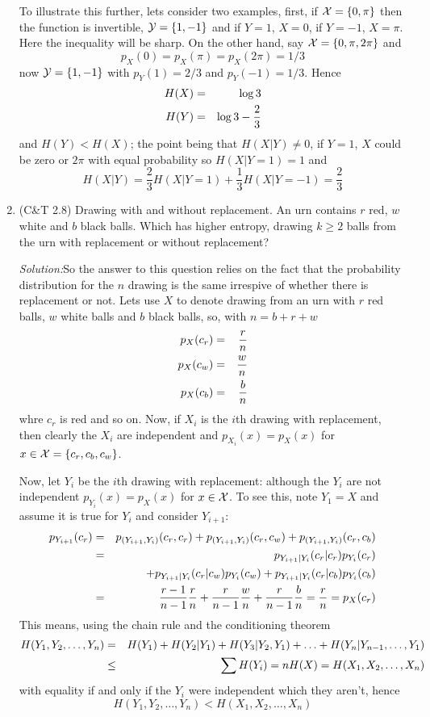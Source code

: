 \documentclass[12pt]{article}
\newcommand{\soln}{\noindent\textit{Solution:}}
\begin{document}
\begin{enumerate}
To illustrate this further, lets consider two examples, first, if
${\cal X}=\{0,\pi\}$ then the function is invertible, ${\cal
  Y}=\{1,-1\}$ and if $Y=1$, $X=0$, if $Y=-1$, $X=\pi$. Here the
inequality will be sharp. On the other hand, say ${\cal X}=\{0,\pi,2\pi\}$ and 
\begin{equation}
p_X(0)=p_X(\pi)=p_X(2\pi)=1/3
\end{equation}
now ${\cal Y}=\{1,-1\}$ with $p_Y(1)=2/3$ and $p_Y(-1)=1/3$. Hence 
\begin{eqnarray}
H(X)&=&\log{3}\cr
H(Y)&=&\log{3}-\frac{2}{3}
\end{eqnarray}
and $H(Y)<H(X)$; the point being that $H(X|Y)\not=0$, if $Y=1$, $X$ could be zero or $2\pi$ with equal probability so $H(X|Y=1)=1$ and
\begin{equation}
H(X|Y)=\frac{2}{3}H(X|Y=1)+\frac{1}{3}H(X|Y=-1)=\frac{2}{3}
\end{equation}


\item (C\&T 2.8) Drawing with and without replacement. An urn contains
$r$ red, $w$ white and $b$ black balls. Which has higher entropy,
drawing $k\ge 2$ balls from the urn with replacement or without
replacement?


\soln So the answer to this question relies on the fact that the
probability distribution for the $n$ drawing is the same irrespive of
whether there is replacement or not. Lets use $X$ to denote drawing from an urn with $r$ red balls, $w$ white balls and $b$ black balls, so, with $n=b+r+w$
\begin{eqnarray}
p_X(c_r)&=&\frac{r}{n}\cr
p_X(c_w)&=&\frac{w}{n}\cr
p_X(c_b)&=&\frac{b}{n}
\end{eqnarray}
whre $c_r$ is red and so on. Now, if $X_i$ is the $i$th drawing with replacement, then clearly the $X_i$ are independent and $p_{X_i}(x)=p_X(x)$ for $x\in{\cal X}=\{c_r,c_b,c_w\}$.

Now, let $Y_i$ be the $i$th drawing with replacement: although the
$Y_i$ are not independent $p_{Y_i}(x)=p_X(x)$ for $x\in{\cal X}$. To see this, note $Y_1=X$ and assume it is true for $Y_i$ and consider $Y_{i+1}$:
\begin{eqnarray}
p_{Y_{i+1}}(c_r)&=&p_{(Y_{i+1},Y_i)}(c_r,c_r)+p_{(Y_{i+1},Y_i)}(c_r,c_w)+p_{(Y_{i+1},Y_i)}(c_r,c_b)\cr
&=&p_{Y_{i+1}|Y_i}(c_r|c_r)p_{Y_i}(c_r)\cr&&+p_{Y_{i+1}|Y_i}(c_r|c_w)p_{Y_i}(c_w)+p_{Y_{i+1}|Y_i}(c_r|c_b)p_{Y_i}(c_b)\cr
&=&\frac{r-1}{n-1}\frac{r}{n}+\frac{r}{n-1}\frac{w}{n}+\frac{r}{n-1}\frac{b}{n}=\frac{r}{n}=p_X(c_r)
\end{eqnarray}
This means, using the chain rule and the conditioning theorem
\begin{eqnarray}
H(Y_1,Y_2,\ldots,Y_n)&=&H(Y_1)+H(Y_2|Y_1)+H(Y_3|Y_2,Y_1)+\ldots+H(Y_n|Y_{n-1},\ldots,Y_1)\cr&\le& 
\sum H(Y_i)=nH(X)=H(X_1,X_2,\ldots,X_n)
\end{eqnarray}
with equality if and only if the $Y_i$ were independent which they aren't, hence 
\begin{equation}
H(Y_1,Y_2,\ldots,Y_n)<H(X_1,X_2,\ldots,X_n)
\end{equation}



\end{enumerate}
\end{document}
